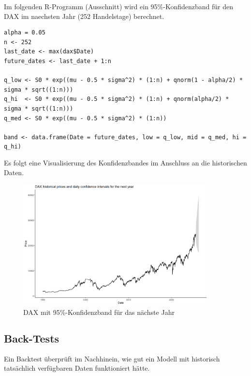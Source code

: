 \begin{bsp}

Im folgenden R-Programm (Ausschnitt) wird ein 95\%-Konfidenzband für den DAX im naechsten Jahr (252 Handelstage) berechnet.

\begin{lstlisting}
alpha = 0.05
n <- 252
last_date <- max(dax$Date)
future_dates <- last_date + 1:n

q_low <- S0 * exp((mu - 0.5 * sigma^2) * (1:n) + qnorm(1 - alpha/2) * sigma * sqrt((1:n)))
q_hi  <- S0 * exp((mu - 0.5 * sigma^2) * (1:n) + qnorm(alpha/2) * sigma * sqrt((1:n)))
q_med <- S0 * exp((mu - 0.5 * sigma^2) * (1:n))

band <- data.frame(Date = future_dates, low = q_low, mid = q_med, hi = q_hi)
\end{lstlisting}

Es folgt eine Visualisierung des Konfidenzbandes im Anschluss an die historischen Daten.

\begin{figure}[H]
    \centering
    \includegraphics[width=0.9\textwidth]{images/dax_confidence_band.png}
    \caption{DAX mit 95\%-Konfidenzband für das nächste Jahr}
    \label{fig:dax_confidence_band}
\end{figure}

\end{bsp}


\subsection{Back-Tests}

Ein Backtest überprüft im Nachhinein, wie gut ein Modell mit historisch tatsächlich 
verfügbaren Daten funktioniert hätte.

